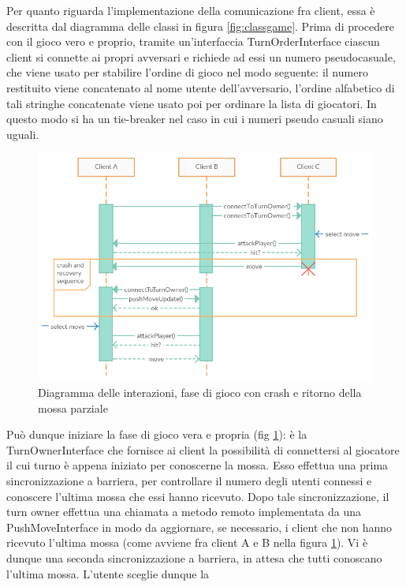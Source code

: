 Per quanto riguarda l'implementazione della comunicazione fra client, essa è descritta dal
diagramma delle classi in figura \ref{fig:classgame}.
Prima di procedere con il gioco vero e proprio, tramite un'interfaccia 
TurnOrderInterface ciascun client si connette ai propri avversari e richiede ad 
essi un numero pseudocasuale, che viene usato per stabilire l'ordine di gioco 
nel modo seguente: il numero restituito viene concatenato al nome utente 
dell'avversario, l'ordine alfabetico di tali stringhe concatenate viene usato 
poi per ordinare la lista di giocatori. In questo modo si ha un tie-breaker nel 
caso in cui i numeri pseudo casuali siano uguali.
\\
\begin{figure}[!ht]
    \centering
    \includegraphics[scale=0.55,center]{core/imgs/UML/sequence/game.png}
    \caption{Diagramma delle interazioni, fase di gioco con crash e ritorno 
della mossa parziale}
    \label{fig:gameseq}
\end{figure}
Può dunque iniziare la fase di gioco vera e propria (fig \ref{fig:gameseq}): è 
la TurnOwnerInterface 
che fornisce ai client la possibilità di connettersi al giocatore il cui turno 
è appena iniziato per conoscerne la mossa. Esso effettua una prima 
sincronizzazione a barriera, per controllare il numero degli utenti connessi e 
conoscere l'ultima mossa che essi hanno ricevuto. Dopo tale sincronizzazione, 
il turn owner effettua una chiamata a metodo remoto implementata da una 
PushMoveInterface in modo da aggiornare, se necessario, i client che non hanno 
ricevuto l'ultima mossa (come avviene fra client A e B nella figura 
\ref{fig:gameseq}). Vi è dunque una seconda sincronizzazione a barriera, 
in attesa che tutti conoscano l'ultima mossa. L'utente sceglie dunque la 
